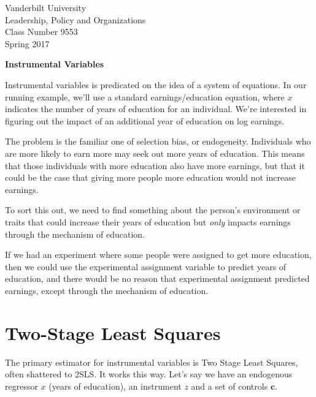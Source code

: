 \documentclass[12 pt]{article}
\begin{document}
\thispagestyle{empty}%


\setmarginsrb{1in}{.5in}{.1in}{.5in}{0pt}{0mm}{0pt}{0mm}%

\setlength{\parskip}{1ex plus 0.5ex minus 0.2ex}

\setcounter{secnumdepth}{-2}



\begin{flushleft}
Vanderbilt University\\Leadership, Policy and Organizations\\Class Number 9553\\ Spring 2017
\end{flushleft}

\begin{center}
\textbf{Instrumental Variables}
\end{center}

Instrumental variables is predicated on the idea of a system of
equations. In our running example, we'll use a standard
earnings/education equation, where $x$ indicates the number of years
of education for an individual. We're interested in figuring out the
impact of an additional year of education on log earnings. 

The problem is the familiar one of selection bias, or
endogeneity. Individuals who are more likely to earn more may seek out
more years of education. This means that those individuals with more
education also have more earnings, but that it could be the case  
that giving more people more education would not increase earnings. 

To sort this out, we need to find something about the person's
environment or traits that could increase their years of education but
\textit{only} impacts earnings through the mechanism of education. 

If we had an experiment where some people were assigned to get more
education, then we could use the experimental assignment variable to
predict years of education, and there would be no reason that
experimental assignment predicted earnings, except through the
mechanism of education. 

\section{Two-Stage Least Squares}
\label{sec:two-stage-least}

The primary estimator for instrumental variables is Two Stage Least
Squares, often shattered to 2SLS. It works this way. Let's say we have
an endogenous regressor $x$ (years of education), an instrument $z$ and a
set of controls $\boldsymbol{c}$.
\end{document}
